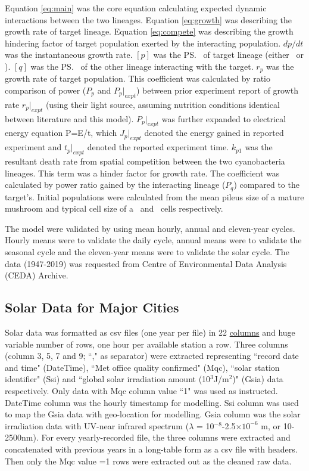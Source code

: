 \documentclass[../thesis.tex]{subfiles} %
\begin{document}
Equation \ref{eq:main} was the core equation calculating expected dynamic interactions between the two lineages.  Equation \ref{eq:growth} was describing the growth rate of target lineage.  Equation \ref{eq:compete} was describing the growth hindering factor of target population exerted by the interacting population.  $dp/dt$ was the instantaneous growth rate.  $[p]$ was the \ps\ of target lineage (either \Ss\ or \Cs).  $[q]$ was the \ps\ of the other lineage interacting with the target.  $r_p$ was the growth rate of target population.  This coefficient was calculated by ratio comparison of power ($P_p$ and $P_p|_{expt}$) between prior experiment report of growth rate $r_p|_{expt}$ (using their light source, assuming nutrition conditions identical between literature and this model).  $P_p|_{expt}$ was further expanded to electrical energy equation P=E/t, which $J_p|_{expt}$ denoted the energy gained in reported experiment and $t_p|_{expt}$ denoted the reported experiment time.  $k_{p1}$ was the resultant death rate from spatial competition between the two cyanobacteria lineages.  This term was a hinder factor for growth rate.  The coefficient was calculated by power ratio gained by the interacting lineage ($P_q$) compared to the target's.  Initial populations were calculated from the mean pileus size of a mature mushroom and typical cell size of a \Ss\ and \Cs\ cells respectively.

The model were validated by using mean hourly, annual and eleven-year cycles.  Hourly means were to validate the daily cycle, annual means were to validate the seasonal cycle and the eleven-year means were to validate the solar cycle.  The data (1947-2019) was requested from Centre of Environmental Data Analysis (CEDA) Archive.\autocite{solarData}

\subsection{Solar Data for Major Cities} %
Solar data was formatted as csv files (one year per file) in 22 \href{https://artefacts.ceda.ac.uk/badc_datadocs/ukmo-midas/RO_Table.html#definition}{columns} and huge variable number of rows, one hour per available station a row.  Three columns (column 3, 5, 7 and 9; ``," as separator) were extracted representing ``record date and time" (DateTime), ``Met office quality confirmed" (Mqc), ``solar station identifier" (Ssi) and ``global solar irradiation amount (10$^{3}$J/m$^{2}$)" (Gsia) data respectively.  Only data with Mqc column value ``1" was used as instructed.  DateTime column was the hourly timestamp for modelling. Ssi column was used to map the Gsia data with geo-location for modelling.  Gsia column was the solar irradiation data with UV-near infrared spectrum ($\lambda$ = 10$^{-8}$-2.5$\times10^{-6}$ m, or 10-2500nm).  For every yearly-recorded file, the three columns were extracted and concatenated with previous years in a long-table form as a csv file with headers.  Then only the Mqc value =1 rows were extracted out as the cleaned raw data.
\end{document}
